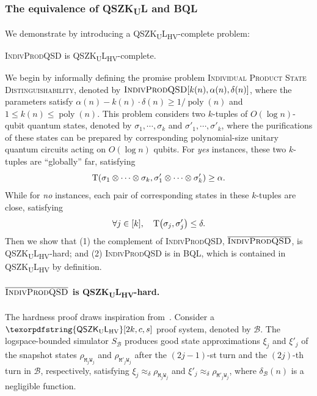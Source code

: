 \documentclass[10pt,a4paper]{article}
\numberwithin{equation}{section}
\numberwithin{figure}{section}
\newcommand{\QSZKUL}{\texorpdfstring{\textnormal{\textsf{QSZK}\textsubscript{\textnormal{U}}\textsf{L}}}\xspace}
\newcommand{\QSZKULHV}{\texorpdfstring{\textnormal{\textsf{QSZK}\textsubscript{\textnormal{U}}\textsf{L}}\textsubscript{\textnormal{HV}}}\xspace}
\newcommand{\BQL}{\textnormal{\textsf{BQL}}\xspace}
\newcommand{\textoverline}[1]{$\overline{\mbox{#1}}$}
\newcommand{\IndivProdQSD}{\textnormal{\textsc{IndivProdQSD}}\xspace}
\newcommand{\coIndivProdQSD}{\texorpdfstring{\textnormal{\textoverline{\textsc{IndivProdQSD}}}}\xspace}
\DeclarePairedDelimiter\rbra{\lparen}{\rparen}
\newcommand{\td}{\mathrm{T}}
\DeclareMathOperator\poly{poly}
\newcommand{\calB}{\mathcal{B}}
\newcommand{\ttM}{\mathtt{M}}
\newcommand{\ttW}{\mathtt{W}}
\begin{document}
\subsubsection{The equivalence of \QSZKUL{} and \BQL{}}

We demonstrate  by introducing a \QSZKULHV{}-complete problem: 

\begin{theorem}
    \label{thm:IndivProdQSD-QSZKLcomplete-informal}
    \IndivProdQSD{} is \QSZKULHV{}-complete.
\end{theorem}

We begin by informally defining the promise problem \textsc{Individual Product State Distinguishability}, denoted by $\IndivProdQSD[k(n),\alpha(n),\delta(n)]$, where the parameters satisfy $\alpha(n) - k(n) \cdot \delta(n) \geq 1/\poly(n)$ and $1 \leq k(n) \leq \poly(n)$. This problem considers two $k$-tuples of $O(\log n)$-qubit quantum states, denoted by $\sigma_1,\cdots,\sigma_k$ and $\sigma'_1,\cdots,\sigma'_k$, where the purifications of these states can be prepared by corresponding polynomial-size unitary quantum circuits acting on $O(\log n)$ qubits. For \textit{yes} instances, these two $k$-tuples are ``globally'' far, satisfying
\begin{equation}
    \label{eq:intro-far}
    \td\rbra*{\sigma_1 \otimes \cdots \otimes \sigma_k, \sigma'_1 \otimes \cdots \otimes \sigma'_k} \geq \alpha. 
\end{equation}
While for \textit{no} instances, each pair of corresponding states in these $k$-tuples are close, satisfying
\begin{equation}
    \label{eq:intro-indiv-close}
    \forall j \in [k], \quad \td\rbra*{\sigma_j,\sigma'_j} \leq \delta.
\end{equation}
Then we show that (1) the complement of \IndivProdQSD{}, 
\coIndivProdQSD{}, is \QSZKULHV{}-hard; and (2) 
\IndivProdQSD{} is in \BQL{}, which is contained in \QSZKULHV{} by definition.

\paragraph{\coIndivProdQSD{} is \QSZKULHV{}-hard.} The hardness proof draws inspiration from~\cite[Section 5]{Wat02QSZK}. Consider a $\QSZKULHV[2k,c,s]$ proof system, denoted by $\calB$. The logspace-bounded simulator $S_{\calB}$ produces good state approximations $\xi_j$ and $\xi'_j$ of the snapshot states $\rho_{\ttM_j\ttW_j}$ and $\rho_{\ttM'_j\ttW_j}$ after the $(2j-1)$-st turn and the $(2j)$-th turn in $\calB$, respectively, satisfying $\xi_j \approx_{\delta} \rho_{\ttM_j\ttW_j}$ and $\xi'_j \approx_{\delta} \rho_{\ttM'_j\ttW_j}$, where $\delta_{\calB}(n)$ is a negligible function. 
\end{document}
